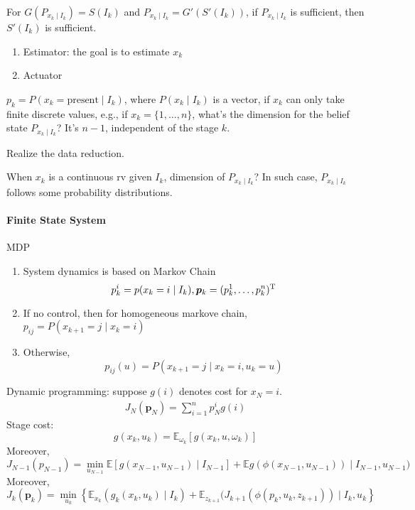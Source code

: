 For $G(P_{x_k\mid I_k}) = S(I_k)$ and $P_{x_k\mid I_k} = G'(S'(I_k))$, if $P_{x_k\mid I_k}$ is sufficient, then $S'(I_k)$ is sufficient.

\begin{enumerate}
\item
Estimator: the goal is to estimate $x_k$
\item
Actuator
\end{enumerate}

$p_k = P(x_k = \text{present}\mid I_k)$, where $P(x_k\mid I_k)$ is a vector, if $x_k$ can only take finite discrete values, e.g., if $x_k=\{1,\dots,n\}$, what's the dimension for the belief state $P_{x_k\mid I_k}$?
It's $n-1$, independent of the stage $k$.

Realize the data reduction.

When $x_k$ is a continuous rv given $I_k$,
dimension of $P_{x_k\mid I_k}$?
In such case, $P_{x_k\mid I_k}$ follows some probability distributions.
\paragraph{Finite State System}
MDP
\begin{enumerate}
\item
System dynamics is based on Markov Chain
\[
p_k^i = p(x_k = i\mid I_k),
\bm p_k  = (p_k^1,\dots,p_k^n)^{\mathrm T}
\]
\item
If no control, then for homogeneous markove chain, $p_{ij} = P(x_{k+1} = j\mid x_k=i)$
\item
Otherwise,
\[
p_{ij}(u) = P(x_{k+1} = j\mid x_k = i, u_k = u)
\]
\end{enumerate}
Dynamic programming:
suppose $g(i)$ denotes cost for $x_N=i$.
\begin{align*}
J_N(\bm p_N)=\sum_{i=1}^np_N^ig(i)
\end{align*}
Stage cost:
\[
g(x_k,u_k) = \mathbb{E}_{\omega_k}[g(x_k,u,\omega_k)]
\]
Moreover,
\[
J_{N-1}(p_{N-1}) = \min_{u_{N-1}}\mathbb{E}
\left[
g(x_{N-1},u_{N-1})\mid I_{N-1}
\right]
+
\mathbb{E}
g(\phi(x_{N-1},u_{N-1}))\mid I_{N-1},u_{N-1})
\]
Moreover,
\[
J_k(\bm p_k)
=
\min_{u_k}\left\{
\mathbb{E}_{x_k}(g_k(x_k,u_k)\mid I_k)
+
\mathbb{E}_{z_{k+1}}
(J_{k+1}(\phi(p_k,u_k,z_{k+1}))\mid I_k,u_k
\right\}
\]

